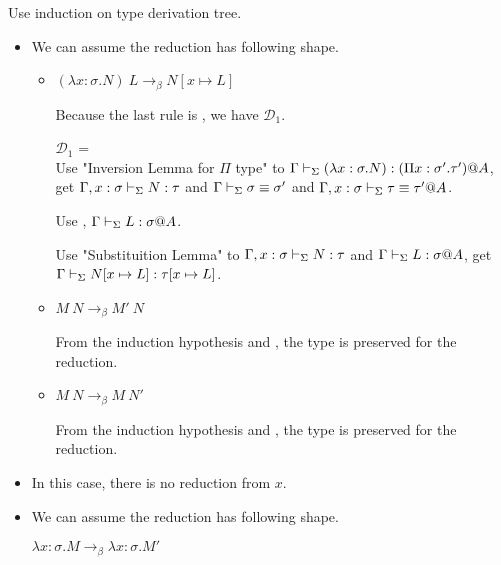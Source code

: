 Use induction on type derivation tree.

\begin{itemize}
	\newcommand{\LB}{\longrightarrow_{\beta}}

	\item \TApp

	      We can assume the reduction has following shape.

	      \begin{itemize}
		      \item $(\lambda x:\sigma.N)\ L \LB N[x\mapsto L]$

		            Because the last rule is \TApp, we have $\mathcal{D}_1$.

		            $\mathcal{D}_1$ = 
		            { \andalso {}} \\

		            Use "Inversion Lemma for $\Pi$ type" to $\Gamma \vdash_\Sigma (\lambda x:\sigma.N) : (\Pi x:\sigma'.\tau')@A$,\\
		            get $\Gamma, x:\sigma \vdash_\Sigma N:\tau$ and $\Gamma \vdash_\Sigma \sigma \equiv \sigma'$ and $\Gamma ,x:\sigma \vdash_\Sigma \tau \equiv \tau'@A$.

		            Use \TConv, $\Gamma \vdash_\Sigma L:\sigma @A$.

		            Use "Substituition Lemma" to $\Gamma, x:\sigma \vdash_\Sigma N:\tau$ and $\Gamma \vdash_\Sigma L:\sigma @A$, get $\Gamma \vdash_\Sigma N[x\mapsto L]:\tau[x\mapsto L]$.

		      \item $M\ N \LB M'\ N$

		            From the induction hypothesis and \TApp, the type is preserved for the reduction.
		      \item $M\ N \LB M\ N'$

		            From the induction hypothesis and \TApp, the type is preserved for the reduction.
	      \end{itemize}

	      \iffullversion

	\item \TVar

	      In this case, there is no reduction from $x$.

	\item \TAbs

	      We can assume the reduction has following shape.

	      $\lambda x:\sigma.M \LB \lambda x:\sigma.M'$


\end{itemize}
